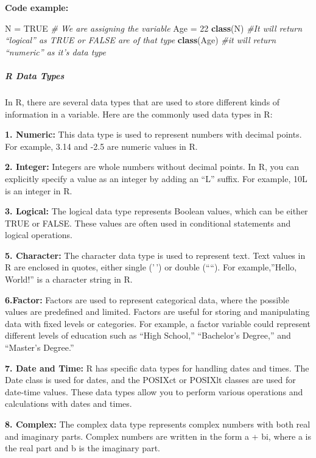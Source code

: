 \documentclass[
]{article}
\newenvironment{Shaded}{\begin{snugshade}}{\end{snugshade}}
\newcommand{\CommentTok}[1]{\textcolor[rgb]{0.56,0.35,0.01}{\textit{#1}}}
\newcommand{\ConstantTok}[1]{\textcolor[rgb]{0.56,0.35,0.01}{#1}}
\newcommand{\DecValTok}[1]{\textcolor[rgb]{0.00,0.00,0.81}{#1}}
\newcommand{\FunctionTok}[1]{\textcolor[rgb]{0.13,0.29,0.53}{\textbf{#1}}}
\newcommand{\NormalTok}[1]{#1}
\newcommand{\OtherTok}[1]{\textcolor[rgb]{0.56,0.35,0.01}{#1}}
\begin{document}
\textbf{Code example: }

\begin{Shaded}
\begin{Highlighting}[]
\NormalTok{N }\OtherTok{=} \ConstantTok{TRUE} \CommentTok{\# We are assigning the variable}
\NormalTok{Age }\OtherTok{=} \DecValTok{22}
\FunctionTok{class}\NormalTok{(N) }\CommentTok{\#It will return “logical” as TRUE or FALSE are of that type }
\FunctionTok{class}\NormalTok{(Age) }\CommentTok{\#it will return “numeric” as it’s data type}
\end{Highlighting}
\end{Shaded}

\hypertarget{r-data-types}{%
\subparagraph{R Data Types}\label{r-data-types}}

In R, there are several data types that are used to store different
kinds of information in a variable. Here are the commonly used data
types in R:

\textbf{1. Numeric:} This data type is used to represent numbers with
decimal points. For example, 3.14 and -2.5 are numeric values in R.

\textbf{2. Integer:} Integers are whole numbers without decimal points.
In R, you can explicitly specify a value as an integer by adding an
``L'' suffix. For example, 10L is an integer in R.

\textbf{3. Logical:} The logical data type represents Boolean values,
which can be either TRUE or FALSE. These values are often used in
conditional statements and logical operations.

\textbf{5. Character:} The character data type is used to represent
text. Text values in R are enclosed in quotes, either single ('\,') or
double (````). For example,''Hello, World!'' is a character string in R.

\textbf{6.Factor:} Factors are used to represent categorical data, where
the possible values are predefined and limited. Factors are useful for
storing and manipulating data with fixed levels or categories. For
example, a factor variable could represent different levels of education
such as ``High School,'' ``Bachelor's Degree,'' and ``Master's Degree.''

\textbf{7. Date and Time:} R has specific data types for handling dates
and times. The Date class is used for dates, and the POSIXct or POSIXlt
classes are used for date-time values. These data types allow you to
perform various operations and calculations with dates and times.

\textbf{8. Complex:} The complex data type represents complex numbers
with both real and imaginary parts. Complex numbers are written in the
form a + bi, where a is the real part and b is the imaginary part.
\end{document}
